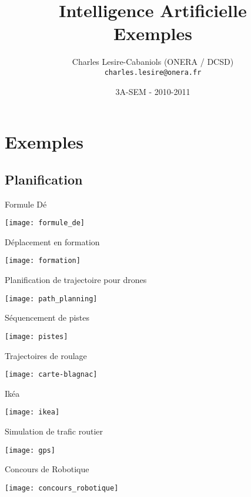 \documentclass[compress]{beamer}
\title[IENAC S09 - IA]{{\Large Intelligence Artificielle}\\Exemples}
\author[Charles Lesire]{Charles Lesire-Cabaniols (ONERA / DCSD)\\{\tt charles.lesire@onera.fr}}
\date[2010-2011]{3A-SEM - 2010-2011}
\begin{document}
\begin{frame}
\titlepage
\end{frame}

\section{Exemples}

\subsection{Planification}

\begin{frame}{Formule Dé}
\begin{center}
\texttt{[image: formule\_de]}
\end{center}
\end{frame}

\begin{frame}{Déplacement en formation}
\begin{center}
\texttt{[image: formation]}
\end{center}
\end{frame}

\begin{frame}{Planification de trajectoire pour drones}
\begin{center}
\texttt{[image: path\_planning]}
\end{center}
\end{frame}

\begin{frame}{Séquencement de pistes}
\begin{center}
\texttt{[image: pistes]}
\end{center}
\end{frame}

\begin{frame}{Trajectoires de roulage}
\begin{center}
\texttt{[image: carte-blagnac]}
\end{center}
\end{frame}

\begin{frame}{Ikéa}
\begin{center}
\texttt{[image: ikea]}
\end{center}
\end{frame}

\begin{frame}{Simulation de trafic routier}
\begin{center}
\texttt{[image: gps]}
\end{center}
\end{frame}

\begin{frame}{Concours de Robotique}
\begin{center}
\texttt{[image: concours\_robotique]}
\end{center}
\end{frame}
\end{document}
